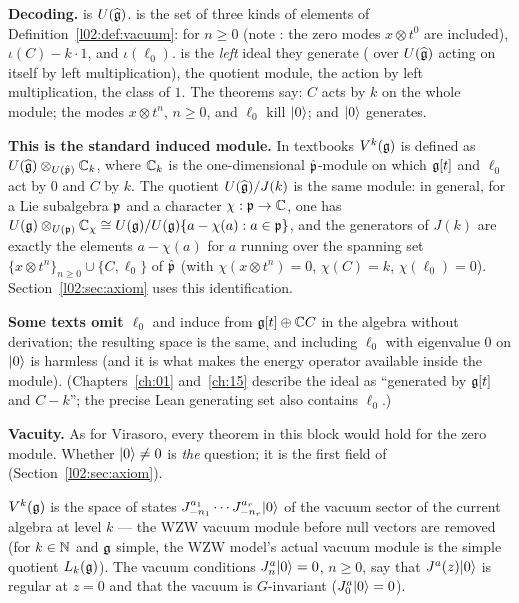 \begin{dictionary}
\textbf{Decoding.}  is $U(\widehat{\mathfrak{g}})$.  is the set of three
kinds of elements of Definition~\ref{l02:def:vacuum}:  for $n\ge0$ (note
: the zero modes $x\otimes t^0$ are included), $\iota(C) - k\cdot1$, and $\iota(\ell_0)$.
 is the \emph{left} ideal they generate ( over $U(\widehat{\mathfrak{g}})$
acting on itself by left multiplication),  the quotient module, 
the action by left multiplication,  the class of $1$. The theorems say: $C$ acts
by $k$ on the whole module; the modes $x\otimes t^n$, $n\ge0$, and $\ell_0$ kill $|0\rangle$; and
$|0\rangle$ generates.

\textbf{This is the standard induced module.} In textbooks $V^k(\mathfrak{g})$ is defined as
$U(\widehat{\mathfrak{g}})\otimes_{U(\hat{\mathfrak{p}})}{\mathbb{C}}_k$, where ${\mathbb{C}}_k$ is the one-dimensional $\hat{\mathfrak{p}}$-module on
which $\mathfrak{g}[t]$ and $\ell_0$ act by $0$ and $C$ by $k$. The quotient $U(\widehat{\mathfrak{g}})/J(k)$ is the same
module: in general, for a Lie subalgebra $\mathfrak{p}$ and a character $\chi:\mathfrak{p}\to{\mathbb{C}}$, one has
$U(\mathfrak{g})\otimes_{U(\mathfrak{p})}{\mathbb{C}}_\chi\cong U(\mathfrak{g})/U(\mathfrak{g})\{a-\chi(a): a\in\mathfrak{p}\}$, and the
generators of $J(k)$ are exactly the elements $a-\chi(a)$ for $a$ running over the spanning set
$\{x\otimes t^n\}_{n\ge0}\cup\{C,\ell_0\}$ of $\hat{\mathfrak{p}}$ (with $\chi(x\otimes t^n) = 0$,
$\chi(C) = k$, $\chi(\ell_0) = 0$). Section~\ref{l02:sec:axiom} uses this identification.

\textbf{Some texts omit $\ell_0$} and induce from $\mathfrak{g}[t]\oplus{\mathbb{C}} C$ in the algebra without
derivation; the resulting space is the same, and including $\ell_0$ with eigenvalue $0$ on $|0\rangle$
is harmless (and it is what makes the energy operator available inside the module).
(Chapters~\ref{ch:01} and~\ref{ch:15} describe the ideal as ``generated by $\mathfrak{g}[t]$ and $C-k$'';
the precise Lean generating set also contains $\ell_0$.)

\textbf{Vacuity.} As for Virasoro, every theorem in this block would hold for the zero module.
Whether $|0\rangle\ne0$ is \emph{the} question; it is the first field of 
(Section~\ref{l02:sec:axiom}).
\end{dictionary}

\begin{physics}
$V^k(\mathfrak{g})$ is the space of states $J^{a_1}_{-n_1}\cdots J^{a_r}_{-n_r}|0\rangle$ of the vacuum
sector of the current algebra at level $k$ --- the WZW vacuum module before null vectors are removed
(for $k\in{\mathbb{N}}$ and $\mathfrak{g}$ simple, the WZW model's actual vacuum module is the simple quotient
$L_k(\mathfrak{g})$). The vacuum conditions $J^a_n|0\rangle = 0$, $n\ge0$, say that $J^a(z)|0\rangle$ is regular
at $z=0$ and that the vacuum is $G$-invariant ($J^a_0|0\rangle = 0$).
\end{physics}

